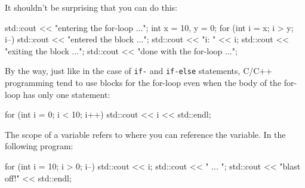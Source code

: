 It shouldn't be surprising that you can do this:
\begin{console}
std::cout << "entering the for-loop ...\n";
int x = 10, y = 0;
for (int i = x; i > y; i--)
{
        std::cout << "entered the block ...\n";
        std::cout << "i: " << i;
        std::cout << "exiting the block ...\n";
}
std::cout << "done with the for-loop ...\n";
\end{console}

By the way, just like in the case of \texttt{if-} and \texttt{if-else} statements, C/C++ programming tend to use blocks for the for-loop even when the body of the for-loop has only one statement:
\begin{console}
for (int i = 0; i < 10; i++)
{
        std::cout << i << std::endl;
}
\end{console}



\newpage{}

The scope of a variable refers to where you can reference the variable.
In the following program:
\begin{console}
for (int i = 10; i > 0; i--)
{   
    std::cout << i;
    std::cout << " ... ";
}
std::cout << "blast off!" << std::endl;
\end{console}


